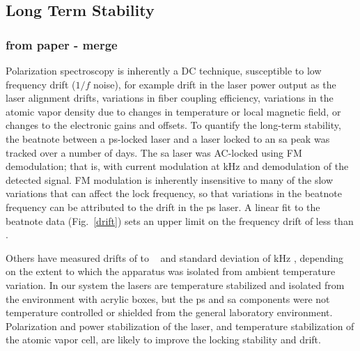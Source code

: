 \subsection{Long Term Stability}
\subsubsection{from paper - merge}
Polarization spectroscopy is inherently a DC technique, susceptible to low frequency drift ($1/f$ noise), for example drift in the laser power output as the laser alignment drifts, variations in fiber coupling efficiency, variations in the atomic vapor density due to changes in temperature or local magnetic field, or changes to the electronic gains and offsets.
To quantify the long-term stability, the beatnote between a \gls*{ps}-locked laser and a laser locked to an \gls*{sa} peak was tracked over a number of days.
The \gls*{sa} laser was AC-locked using FM demodulation; that is, with current modulation at \unit[250]{kHz} and demodulation of the detected signal.
FM modulation is inherently insensitive to many of the slow variations that can affect the lock frequency, so that variations in the beatnote frequency can be attributed to the drift in the \gls*{ps} laser.
A linear fit to the beatnote data (Fig.~\ref{drift}) sets an upper limit on the frequency drift of less than . 

Others have measured drifts of  to ~\cite{yoshikawa_frequency_2003, tiwari_laser_2006} and standard deviation of \unit[400]{kHz} \cite{lee_frequency_2014}, depending on the extent to which the apparatus was isolated from ambient temperature variation.
In our system the lasers are temperature stabilized and isolated from the environment with acrylic boxes, but the \gls*{ps} and \gls*{sa} components were not temperature controlled or shielded from the general laboratory environment.
Polarization and power stabilization of the laser, and temperature stabilization of the atomic vapor cell, are likely to improve the locking stability and drift.

